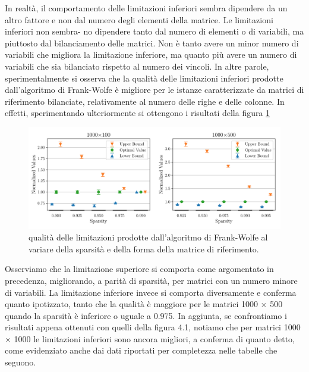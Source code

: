 In realtà, il comportamento delle limitazioni inferiori sembra dipendere da un altro fattore e non dal numero degli
elementi della matrice. Le limitazioni inferiori non sembra- no dipendere tanto dal numero di elementi o di variabili,
ma piuttosto dal bilanciamento delle matrici. Non è tanto avere un minor numero di variabili che migliora la limitazione
inferiore, ma quanto più avere un numero di variabili che sia bilanciato rispetto al numero dei vincoli. In altre
parole, sperimentalmente si osserva che la qualità delle limitazioni inferiori prodotte dall’algoritmo di Frank-Wolfe è
migliore per le istanze caratterizzate da matrici di riferimento bilanciate, relativamente al numero delle righe e delle
colonne. In effetti, sperimentando ulteriormente si ottengono i risultati della figura \ref{fig:morevars}


\begin{figure}[ht]
    \centering
    \includegraphics[width=\textwidth]{assets/figures/shape_more_vars.pdf}
    \caption{qualità delle limitazioni prodotte dall'algoritmo di Frank-Wolfe al variare della sparsità e della forma
    della matrice di riferimento.}
    \label{fig:morevars}
\end{figure}

\noindent
Osserviamo che la limitazione superiore si comporta come argomentato in precedenza, migliorando, a parità di sparsità,
per matrici con un numero minore di variabili. La limitazione inferiore invece si comporta diversamente e conferma
quanto ipotizzato, tanto che la qualità è maggiore per le matrici 1000 × 500 quando la sparsità è inferiore o uguale a
0.975. In aggiunta, se confrontiamo i risultati appena ottenuti con quelli della figura 4.1, notiamo che per matrici
1000 × 1000 le limitazioni inferiori sono ancora migliori, a conferma di quanto detto, come evidenziato anche dai dati
riportati per completezza nelle tabelle che seguono.

